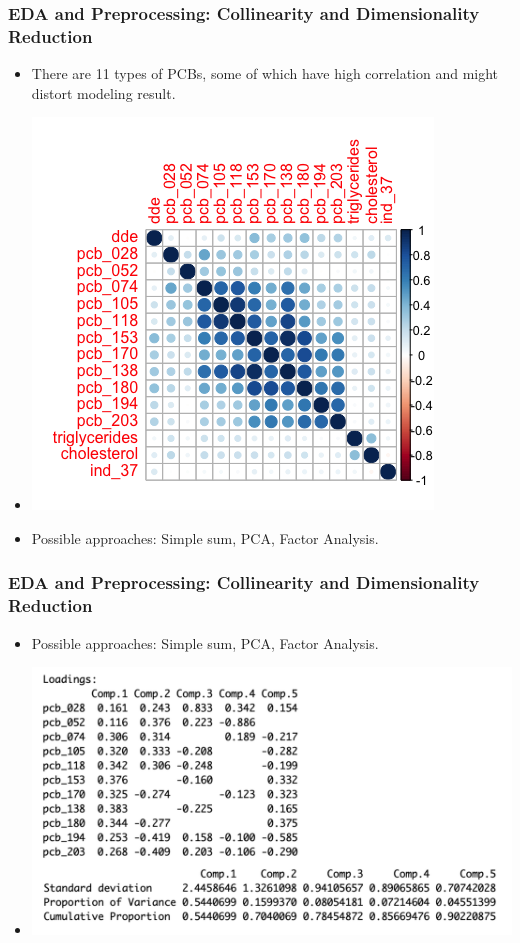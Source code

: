 \documentclass{beamer}
\begin{document}
\begin{frame}
    \frametitle{EDA and Preprocessing: Collinearity and Dimensionality Reduction}

    \begin{itemize}
        \item There are 11 types of PCBs, some of which have high correlation and might distort modeling result.
        \pause
        \item  \includegraphics[scale=0.4]{corrplot.png}
        \item Possible approaches: Simple sum, PCA, Factor Analysis.
    \end{itemize}

\end{frame}

\begin{frame}
    \frametitle{EDA and Preprocessing: Collinearity and Dimensionality Reduction}

    \begin{itemize}
        \item Possible approaches: Simple sum, PCA, Factor Analysis.
        \pause
        \item \includegraphics[scale=0.4]{PCA.png}


    \end{itemize}
\end{frame}
\end{document}
